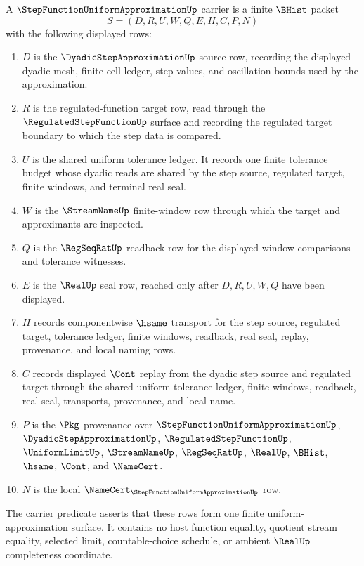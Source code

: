 \begin{definition}
\label{def:step-function-uniform-approximation-carrier}
A $\StepFunctionUniformApproximationUp$ carrier is a finite $\BHist$ packet
$$
S=(D,R,U,W,Q,E,H,C,P,N)
$$
with the following displayed rows:
\begin{enumerate}
\item $D$ is the $\DyadicStepApproximationUp$ source row, recording the displayed dyadic mesh, finite cell ledger, step values, and oscillation bounds used by the approximation.
\item $R$ is the regulated-function target row, read through the $\RegulatedStepFunctionUp$ surface and recording the regulated target boundary to which the step data is compared.
\item $U$ is the shared uniform tolerance ledger. It records one finite tolerance budget whose dyadic reads are shared by the step source, regulated target, finite windows, and terminal real seal.
\item $W$ is the $\StreamNameUp$ finite-window row through which the target and approximants are inspected.
\item $Q$ is the $\RegSeqRatUp$ readback row for the displayed window comparisons and tolerance witnesses.
\item $E$ is the $\RealUp$ seal row, reached only after $D,R,U,W,Q$ have been displayed.
\item $H$ records componentwise $\hsame$ transport for the step source, regulated target, tolerance ledger, finite windows, readback, real seal, replay, provenance, and local naming rows.
\item $C$ records displayed $\Cont$ replay from the dyadic step source and regulated target through the shared uniform tolerance ledger, finite windows, readback, real seal, transports, provenance, and local name.
\item $P$ is the $\Pkg$ provenance over $\StepFunctionUniformApproximationUp$, $\DyadicStepApproximationUp$, $\RegulatedStepFunctionUp$, $\UniformLimitUp$, $\StreamNameUp$, $\RegSeqRatUp$, $\RealUp$, $\BHist$, $\hsame$, $\Cont$, and $\NameCert$.
\item $N$ is the local $\NameCert_{\StepFunctionUniformApproximationUp}$ row.
\end{enumerate}
The carrier predicate asserts that these rows form one finite uniform-approximation surface. It contains no host function equality, quotient stream equality, selected limit, countable-choice schedule, or ambient $\RealUp$ completeness coordinate.
\end{definition}

